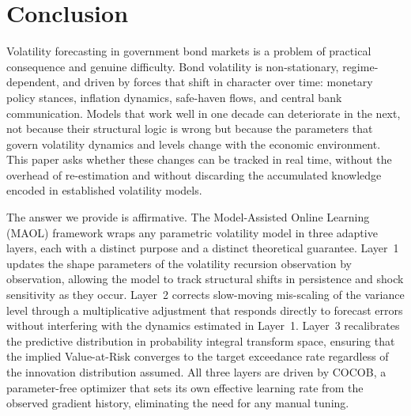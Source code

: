 \section{Conclusion}\label{sec:conclusion}

Volatility forecasting in government bond markets is a problem of practical consequence and genuine difficulty. Bond volatility is non-stationary, regime-dependent, and driven by forces that shift in character over time: monetary policy stances, inflation dynamics, safe-haven flows, and central bank communication. Models that work well in one decade can deteriorate in the next, not because their structural logic is wrong but because the parameters that govern volatility dynamics and levels change with the economic environment. This paper asks whether these changes can be tracked in real time, without the overhead of re-estimation and without discarding the accumulated knowledge encoded in established volatility models.

The answer we provide is affirmative. The Model-Assisted Online Learning (MAOL) framework wraps any parametric volatility model in three adaptive layers, each with a distinct purpose and a distinct theoretical guarantee. Layer~1 updates the shape parameters of the volatility recursion observation by observation, allowing the model to track structural shifts in persistence and shock sensitivity as they occur. Layer~2 corrects slow-moving mis-scaling of the variance level through a multiplicative adjustment that responds directly to forecast errors without interfering with the dynamics estimated in Layer~1. Layer~3 recalibrates the predictive distribution in probability integral transform space, ensuring that the implied Value-at-Risk converges to the target exceedance rate regardless of the innovation distribution assumed. All three layers are driven by COCOB, a parameter-free optimizer that sets its own effective learning rate from the observed gradient history, eliminating the need for any manual tuning.


